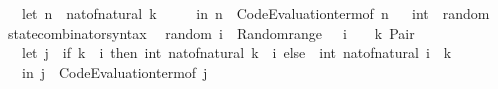 \begin{isabellebody}
\ \ \ \ \ let\ n\ {\isacharequal}{\kern0pt}\ nat{\isacharunderscore}{\kern0pt}of{\isacharunderscore}{\kern0pt}natural\ k\isanewline
\ \ \ \ \ in\ {\isacharparenleft}{\kern0pt}n{\isacharcomma}{\kern0pt}\ {\isasymlambda}{\isacharunderscore}{\kern0pt}{\isachardot}{\kern0pt}\ Code{\isacharunderscore}{\kern0pt}Evaluation{\isachardot}{\kern0pt}term{\isacharunderscore}{\kern0pt}of\ n{\isacharparenright}{\kern0pt}{\isacharparenright}{\kern0pt}{\isacharparenright}{\kern0pt}{\isachardoublequoteclose}\isanewline
\isanewline
{}\isamarkupfalse%
%
\isadelimproof
\ %
\endisadelimproof
%
\isatagproof
\isacommand{{\isachardot}{\kern0pt}{\isachardot}{\kern0pt}}\isamarkupfalse%
%
\endisatagproof
{\isafoldproof}%
%
\isadelimproof
%
\endisadelimproof
\isanewline
\isanewline
{}\isamarkupfalse%
\isanewline
\isanewline
{}\isamarkupfalse%
\isanewline
\isanewline
{}\isamarkupfalse%
\ int\ {\isacharcolon}{\kern0pt}{\isacharcolon}{\kern0pt}\ random\isanewline
{}\isanewline
\isanewline
{}\isamarkupfalse%
\isanewline
\ \ \ state{\isacharunderscore}{\kern0pt}combinator{\isacharunderscore}{\kern0pt}syntax\isanewline
{}\isanewline
\isanewline
{}\isamarkupfalse%
\isanewline
\ \ {\isachardoublequoteopen}random\ i\ {\isacharequal}{\kern0pt}\ Random{\isachardot}{\kern0pt}range\ {\isacharparenleft}{\kern0pt}{}\ {\isacharasterisk}{\kern0pt}\ i\ {\isacharplus}{\kern0pt}\ {}{\isacharparenright}{\kern0pt}\ {\isasymcirc}{\isasymrightarrow}\ {\isacharparenleft}{\kern0pt}{\isasymlambda}k{\isachardot}{\kern0pt}\ Pair\ {\isacharparenleft}{\kern0pt}\isanewline
\ \ \ \ \ let\ j\ {\isacharequal}{\kern0pt}\ {\isacharparenleft}{\kern0pt}if\ k\ {\isasymge}\ i\ then\ int\ {\isacharparenleft}{\kern0pt}nat{\isacharunderscore}{\kern0pt}of{\isacharunderscore}{\kern0pt}natural\ {\isacharparenleft}{\kern0pt}k\ {\isacharminus}{\kern0pt}\ i{\isacharparenright}{\kern0pt}{\isacharparenright}{\kern0pt}\ else\ {\isacharminus}{\kern0pt}\ {\isacharparenleft}{\kern0pt}int\ {\isacharparenleft}{\kern0pt}nat{\isacharunderscore}{\kern0pt}of{\isacharunderscore}{\kern0pt}natural\ {\isacharparenleft}{\kern0pt}i\ {\isacharminus}{\kern0pt}\ k{\isacharparenright}{\kern0pt}{\isacharparenright}{\kern0pt}{\isacharparenright}{\kern0pt}{\isacharparenright}{\kern0pt}\isanewline
\ \ \ \ \ in\ {\isacharparenleft}{\kern0pt}j{\isacharcomma}{\kern0pt}\ {\isasymlambda}{\isacharunderscore}{\kern0pt}{\isachardot}{\kern0pt}\ Code{\isacharunderscore}{\kern0pt}Evaluation{\isachardot}{\kern0pt}term{\isacharunderscore}{\kern0pt}of\ j{\isacharparenright}{\kern0pt}{\isacharparenright}{\kern0pt}{\isacharparenright}{\kern0pt}{\isachardoublequoteclose}\isanewline

\end{isabellebody}
